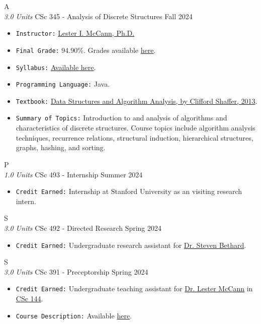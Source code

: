 \cventry
{A \\ \small{\textit{3.0 Units}}}
{CSc 345 - Analysis of Discrete Structures}
{Fall 2024}
{}
{}
{
  \begin{itemize}
    \item \texttt{Instructor:} \href{http://mccann.cs.arizona.edu}{Lester I. McCann, Ph.D.}
    \item \texttt{Final Grade:} 94.90\%. Grades available \href{https://mhrezaei.com/assets/cv/courses/Fall2024/CSC345/Grades.pdf}{here}.
    \item \texttt{Syllabus:} \href{https://mhrezaei.com/assets/cv/courses/Fall2024/CSC345/Syllabus.pdf}{Available here}.
    \item \texttt{Programming Language:} Java.
    \item \texttt{Textbook:} \href{https://people.cs.vt.edu/shaffer/Book/JAVA3elatest.pdf}{Data Structures and Algorithm Analysis, by Clifford Shaffer, 2013}.
    \item \texttt{Summary of Topics:} Introduction to and analysis of algorithms and characteristics of discrete structures. Course
    topics include algorithm analysis techniques, recurrence relations, structural induction,
    hierarchical structures, graphs, hashing, and sorting.
  \end{itemize}
}


\cventry
{P \\ \small{\textit{1.0 Units}}}
{CSc 493 - Internship}
{Summer 2024}
{}
{}
{
  \begin{itemize}
    \item \texttt{Credit Earned:} Internship at Stanford University as an visiting research intern.
  \end{itemize}
}

\cventry
{S \\ \small{\textit{3.0 Units}}}
{CSc 492 - Directed Research}
{Spring 2024}
{}
{}
{
  \begin{itemize}
    \item \texttt{Credit Earned:} Undergraduate research assistant for \href{https://bethard.github.io/}{Dr. Steven Bethard}.
  \end{itemize}
}

\cventry
{S \\ \small{\textit{3.0 Units}}}
{CSc 391 - Preceptorship}
{Spring 2024}
{}
{}
{
  \begin{itemize}
    \item \texttt{Credit Earned:} Undergraduate teaching assistant for \href{https://mccann.cs.arizona.edu/}{Dr. Lester McCann} in \href{https://www2.cs.arizona.edu/classes/cs144/fall23-002/}{CSc 144}.
    \item \texttt{Course Description:} Available \href{https://mhrezaei.com/assets/cv/courses/Fall2023/CSC391/Syllabus.pdf}{here}.
  \end{itemize}
}

